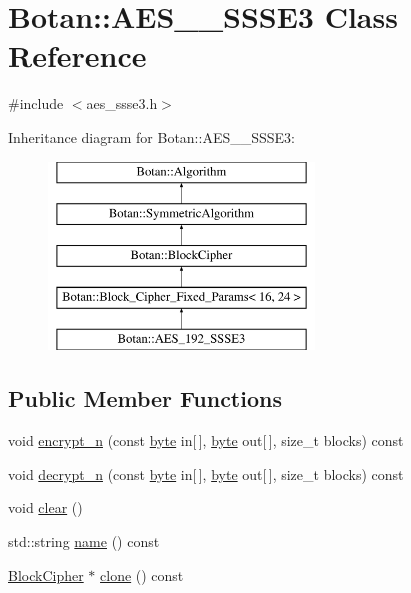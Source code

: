 \hypertarget{classBotan_1_1AES__192__SSSE3}{\section{Botan\-:\-:A\-E\-S\-\_\-\_\-\-S\-S\-S\-E3 Class Reference}
\label{classBotan_1_1AES__192__SSSE3}
}


{\ttfamily \#include $<$aes\-\_\-ssse3.\-h$>$}

Inheritance diagram for Botan\-:\-:A\-E\-S\-\_\-\_\-\-S\-S\-S\-E3\-:\begin{figure}[H]
\begin{center}
\leavevmode
\includegraphics[height=5.000000cm]{classBotan_1_1AES__192__SSSE3}
\end{center}
\end{figure}
\subsection*{Public Member Functions}
\begin{DoxyCompactItemize}
\item 
void \hyperlink{classBotan_1_1AES__192__SSSE3_a999dd6665abd705facbdd175d30ad146}{encrypt\-\_\-n} (const \hyperlink{namespaceBotan_a7d793989d801281df48c6b19616b8b84}{byte} in\mbox{[}$\,$\mbox{]}, \hyperlink{namespaceBotan_a7d793989d801281df48c6b19616b8b84}{byte} out\mbox{[}$\,$\mbox{]}, size\-\_\-t blocks) const 
\item 
void \hyperlink{classBotan_1_1AES__192__SSSE3_a4cff37b92b79a1919b0e0479acb5e149}{decrypt\-\_\-n} (const \hyperlink{namespaceBotan_a7d793989d801281df48c6b19616b8b84}{byte} in\mbox{[}$\,$\mbox{]}, \hyperlink{namespaceBotan_a7d793989d801281df48c6b19616b8b84}{byte} out\mbox{[}$\,$\mbox{]}, size\-\_\-t blocks) const 
\item 
void \hyperlink{classBotan_1_1AES__192__SSSE3_a2c43c35eaf981b5e2f4728bd670950e7}{clear} ()
\item 
std\-::string \hyperlink{classBotan_1_1AES__192__SSSE3_ad2a7cb3ada856ecb2744b3848724e101}{name} () const 
\item 
\hyperlink{classBotan_1_1BlockCipher}{Block\-Cipher} $\ast$ \hyperlink{classBotan_1_1AES__192__SSSE3_aeb16e76e9fa38bee16fa7a9edd66f043}{clone} () const 
\end{DoxyCompactItemize}
